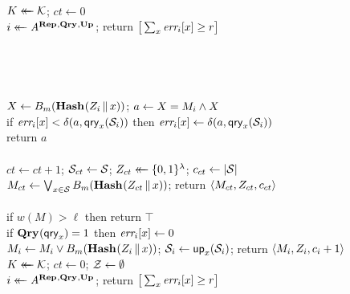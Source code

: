 \begin{figure*}
{
  \vspace{-7pt}
  \\[2pt]
    $K \mathrel{\leftarrow\mkern-14mu\leftarrow} \mathcal{K}$;
    $ct \gets 0$\\
    $i \mathrel{\leftarrow\mkern-14mu\leftarrow} \mathit{A}^{\textup{\textbf{Rep}}\hspace{0.5pt},\textup{\textbf{Qry}}\hspace{0.5pt},\textup{\textbf{Up}}\hspace{0.5pt}}$;
    return $\big[\sum_x \textit{err}_i[x] \geq r\big]$
  \\[6pt]
  \hfill{}\\[2pt]
    \\
  \\[6pt]
  \\[2pt]
    $X \gets {B}_m(\textup{\textbf{Hash}}\hspace{0.5pt}(Z_i \, \| \, x))$;
    $a \gets X = M_i \wedge X$\\
    if $\textit{err}_i[x] < \delta(a,\mathsf{qry}_x(\mathcal{S}_i))$ then
          $\textit{err}_i[x] \gets \delta(a,\mathsf{qry}_x(\mathcal{S}_i))$\\
    return $a$
  \\[6pt]
  \oraclev{$\REPO(\col)$}\\[2pt]
    $ct \gets ct+1$;
    $\mathcal{S}_{ct} \gets \mathcal{S}$;
    $Z_{ct} \mathrel{\leftarrow\mkern-14mu\leftarrow} \{0,1\}^\lambda$;
    $c_{ct} \gets |\mathcal{S}|$\\
    $M_{ct} \gets \bigvee_{x \in \mathcal{S}} {B}_m(\textup{\textbf{Hash}}\hspace{0.5pt}(Z_{ct} \, \| \, x))$;
    return $\langle M_{ct}, Z_{ct}, c_{ct} \rangle$
  \\[6pt]
  \\[2pt]
    if $w(M) > \ell$ then return $\top$\\
    if $\textup{\textbf{Qry}}\hspace{0.5pt}(\mathsf{qry}_x) = 1$ then $\textit{err}_i[x] \gets 0$\\
    $M_i \gets M_i \vee {B}_m(\textup{\textbf{Hash}}\hspace{0.5pt}(Z_i \, \| \, x))$;
    $\mathcal{S}_i \gets \mathsf{up}_x(\mathcal{S}_i)$;
    return $\langle M_i, Z_i, c_i+1\rangle$
}
{
  \vspace{-7pt}
  \hfill{}\\[2pt]
    $K \mathrel{\leftarrow\mkern-14mu\leftarrow} \mathcal{K}$;
    $ct \gets 0$;
    $\mathcal{Z} \gets \emptyset$\\
    $i \mathrel{\leftarrow\mkern-14mu\leftarrow} \mathit{A}^{\textup{\textbf{Rep}}\hspace{0.5pt},\textup{\textbf{Qry}}\hspace{0.5pt},\textup{\textbf{Up}}\hspace{0.5pt}}$;
    return $\big[\sum_x \textit{err}_i[x] \geq r\big]$
  \\[6pt]
  \oraclev{$\REPO(\col)$}\\[2pt]
}
\end{figure*}

